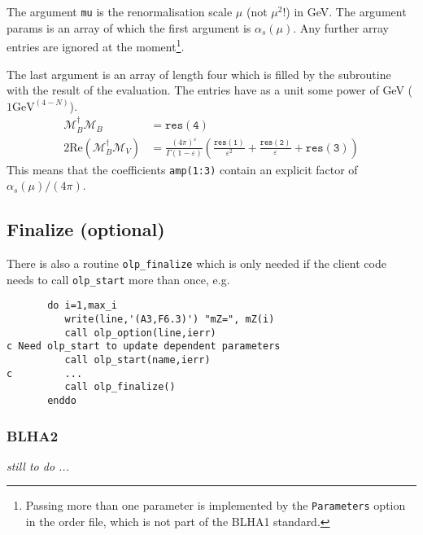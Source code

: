 The argument \texttt{mu} is the renormalisation scale $\mu$ (not $\mu^2$!)
in GeV. The argument params is an array of which the first argument is
$\alpha_s(\mu)$. Any further array entries are ignored at the moment\footnote{
Passing more than one parameter is implemented by the \texttt{Parameters}
option in the order file, which is  not part of the BLHA1 standard.}.

The last argument is an array of length four which is filled by the subroutine
with the result of the evaluation. The entries have as a unit some
power of GeV ($1\mathrm{GeV}^(4-N)$).
\begin{align}
\mathcal{M}_B^\dagger\mathcal{M}_B&=\mathtt{res(4)}\\
2\mathrm{Re}\left(\mathcal{M}_B^\dagger\mathcal{M}_V\right)&=
\frac{(4\pi)^\varepsilon}{\Gamma(1-\varepsilon)}\left(
\frac{\mathtt{res(1)}}{\varepsilon^2}
+\frac{\mathtt{res(2)}}{\varepsilon}
+\mathtt{res(3)}
\right)
\end{align}
This means that the coefficients \texttt{amp(1:3)} contain
an explicit factor of $\alpha_s(\mu)/(4\pi)$.

\subsection{Finalize (optional)}
There is also a routine \texttt{olp\_finalize} which is only needed
if the client code needs to call \texttt{olp\_start} more than once, e.g.
\begin{lstlisting}
       do i=1,max_i
          write(line,'(A3,F6.3)') "mZ=", mZ(i)
          call olp_option(line,ierr)
c Need olp_start to update dependent parameters
          call olp_start(name,ierr)
c         ...
          call olp_finalize()
       enddo
\end{lstlisting}

\subsubsection{BLHA2}

{\it still to do ...}
%
